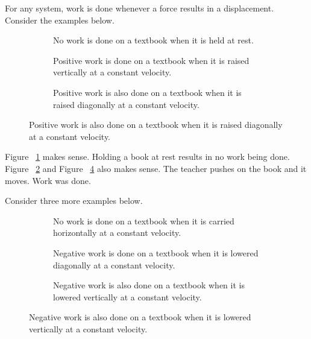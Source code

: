 For any system, work is done whenever a force results in a displacement.
Consider the examples below.
\begin{figure}[ht]
    \centering
    \begin{subfigure}{.20\textwidth}
        \centering
        \caption{No work is done on a textbook when it is held at rest.}
        \label{fig:textbook-at-rest}
    \end{subfigure}
    \hfill
    \begin{subfigure}{.20\textwidth}
        \centering
        \caption{Positive work is done on a textbook when it is raised
        vertically at a constant velocity.}%
        \label{fig:textbook-pushed-up}
    \end{subfigure}
    \hfill
    \begin{subfigure}{.20\textwidth}
        \centering
        \caption{Positive work is also done on a textbook when it is
        raised diagonally at a constant velocity.}%
        \label{fig:textbook-pushed-diagonally}
    \end{subfigure}
\end{figure}

Figure~%
\ref{fig:textbook-at-rest} makes sense.  Holding a book at rest results
in no work being done.  Figure~%
\ref{fig:textbook-pushed-up} and Figure~%
\ref{fig:textbook-pushed-diagonally} also makes sense.  The teacher
pushes on the book and it moves.  Work was done.

Consider three more examples below.
\begin{figure}[ht]
    \centering
    \begin{subfigure}{.25\textwidth}
        \centering
        \caption{No work is done on a textbook when it is carried
        horizontally at a constant velocity.}%
        \label{fig:textbook-pushed-while-moving}
    \end{subfigure}
    \hfill
    \begin{subfigure}{.25\textwidth}
        \centering
        \caption{Negative work is done on a textbook when it is lowered
        diagonally at a constant velocity.}%
        \label{fig:textbook-pushed-while-lowering-diagonally}
    \end{subfigure}
    \hfill
    \begin{subfigure}{.25\textwidth}
        \centering
        \caption{Negative work is also done on a textbook when it is
        lowered vertically at a constant velocity.}%
        \label{fig:textbook-pushed-while-lowering}
    \end{subfigure}
\end{figure}

